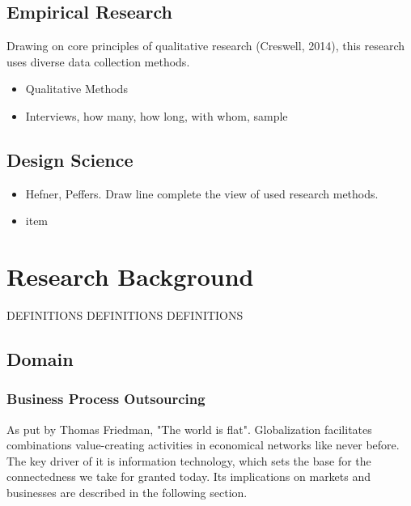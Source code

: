 	\section{Empirical Research}
Drawing on core principles of qualitative research (Creswell, 2014), this research uses diverse data collection methods. 
	
		\begin{itemize}
			\item Qualitative Methods
			\item Interviews, how many, how long, with whom, sample
			
		\end{itemize}
	\section{Design Science}
		\begin{itemize}
			\item Hefner, Peffers. Draw line complete the view of used research methods.
			\item item
		\end{itemize}
\chapter{Research Background}
	DEFINITIONS DEFINITIONS DEFINITIONS
	\section{Domain}
		\subsection{Business Process Outsourcing}
		As put by Thomas Friedman, "The world is flat". Globalization facilitates  combinations value-creating activities in economical networks like never before. The key driver of it is information technology, which sets the base for the connectedness we take for granted today. Its implications on markets and businesses are described in the following section. 
		
